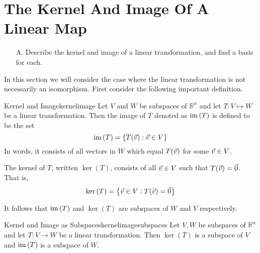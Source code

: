 \section{The Kernel And Image Of A Linear Map}

\begin{outcome}
\begin{enumerate}
\item[A.]  Describe the kernel and image of a linear transformation, and find a basis for each. 
\end{enumerate}
\end{outcome}

In this section we will consider the case where the linear transformation is not necessarily an
isomorphism. First consider the following important definition.

\begin{definition}{Kernel and Image}{kernelimage}
Let $V$ and $W$ be subspaces of $\mathbb{R}^n$ and let $T:V\mapsto W$ be a linear transformation. Then the image of $T$
denoted as $\mbox{im}\left( T\right) $ is defined to be the set 
\begin{equation*}
\mbox{im}\left( T\right) = \left\{T (\vec{v}):\vec{v}\in V\right\}
\end{equation*}
In words, it consists of all vectors in $W$ which equal $T(\vec{v})$ for some $
\vec{v}\in V$.

The kernel of $T$, written $\ker \left( T\right) $, consists of all $\vec{v}\in V$ such that $T(\vec{v})=\vec{0}$. That is, 
\begin{equation*}
\ker \left( T\right) =\left\{ \vec{v}\in V:T(\vec{v})=\vec{0}\right\}
\end{equation*}
\end{definition}

It follows that $\mbox{im}\left( T\right) $ and $\ker \left( T\right) $
are subspaces of $W$ and $V$ respectively.

\begin{proposition}{Kernel and Image as Subspaces}{kernelimagesubspaces}
Let $V, W$ be subspaces of $\mathbb{R}^n$ and let $T:V\rightarrow W$ be a linear transformation. Then $\ker \left(
T\right) $ is a subspace of $V$ and $\mbox{im}\left( T\right) $ is a
subspace of $W$.
\end{proposition}

